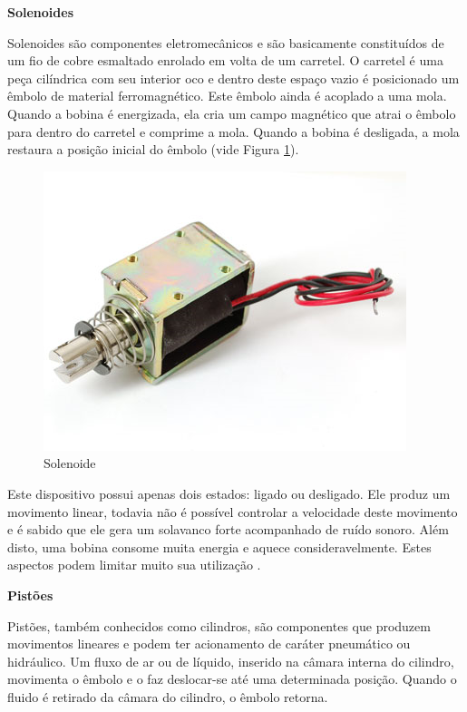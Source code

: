 \begin{anexosenv}





\textbf{Solenoides}

Solenoides são componentes eletromecânicos e são basicamente constituídos de um fio de cobre esmaltado enrolado em volta de um carretel. O carretel é uma peça cilíndrica com seu interior oco e dentro deste espaço vazio é posicionado um êmbolo de material ferromagnético. Este êmbolo ainda é acoplado a uma mola. Quando a bobina é energizada, ela cria um campo magnético que atrai o êmbolo para dentro do carretel e comprime a mola. Quando a bobina é desligada, a mola restaura a posição inicial do êmbolo (vide Figura \ref{solenoide}).

\begin{figure}[htb]
		\centering
			\includegraphics[scale=0.6]{figuras/solenoide.png}
		\caption{Solenoide}
		\label{solenoide}
\end{figure}

Este dispositivo possui apenas dois estados: ligado ou desligado. Ele produz um movimento linear, todavia não é possível controlar a velocidade deste movimento e é sabido que ele gera um solavanco forte acompanhado de ruído sonoro. Além disto, uma bobina consome muita energia e aquece consideravelmente. Estes aspectos podem limitar muito sua utilização \cite{machado}.




\textbf{Pistões}

Pistões, também conhecidos como cilindros, são componentes que produzem movimentos lineares e podem ter acionamento de caráter pneumático ou hidráulico. Um fluxo de ar ou de líquido, inserido na câmara interna do cilindro, movimenta o êmbolo e o faz deslocar-se até uma determinada posição. Quando o fluido é retirado da câmara do cilindro, o êmbolo retorna.


\end{anexosenv}
